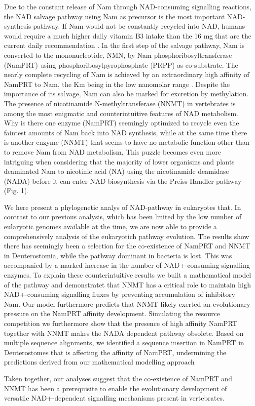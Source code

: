 Due to the constant release of Nam through NAD-consuming signalling reactions, the NAD salvage pathway using Nam as precursor is the most important NAD-synthesis pathway.  If Nam would not be constantly recycled into NAD, humans would require a much higher daily vitamin B3 intake than the 16 mg that are the current daily recommendation \cite{CommissionofEuropeanCommunities2008}.  In the first step of the salvage pathway, Nam is converted to the mononucleotide, NMN, by Nam phosphoribosyltransferase (NamPRT) using phosphoribosylpyrophosphate (PRPP) as co-substrate. The nearly complete recycling of Nam is achieved by an extraordinary high affinity of NamPRT to Nam, the Km being in the low nanomolar range \cite{Burgos2008}. Despite the importance of its salvage, Nam can also be marked for excretion by methylation. The presence of nicotinamide N-methyltransferase (NNMT) in vertebrates \cite{Gossmann2012FEBS} is among the most enigmatic and counterintuitive features of NAD metabolism. Why is there one enzyme (NamPRT) seemingly optimized to recycle even the faintest amounts of Nam back into NAD synthesis, while at the same time there is another enzyme (NNMT) that seems to have no metabolic function other than to remove Nam from NAD metabolism, This puzzle becomes even more intriguing when considering that the majority of lower organisms and plants deaminated Nam to nicotinic acid (NA) using the nicotinamide deamidase (NADA) before it can enter NAD biosynthesis via the Preiss-Handler pathway (Fig. 1).

We here present a phylogenetic analys of NAD-pathway in eukaryotes that. In contrast to our previous analysis, which has been lmited by the low number of eularyotic genomes available at the time, we are now able to provide a comprehensively analysis of the eukaryotich pathway evolution. The results show there has seemingly been a selection for the co-existence of NamPRT and NNMT in Deuterostomia, while the pathway dominant in bacteria is lost. This was accompanied by a marked increase in the number of  NAD+-consuming signalling enzymes. To explain these counterintuitive results we built a mathematical model of the pathway and demonstratet that NNMT has a critical role to maintain high NAD+-consuming signalling fluxes by preventing accumulation of inhibitory Nam. Our model furthermore predicts that NNMT likely exerted an evolutionary pressure on the NamPRT affinity development. Simulating the resource competition we furthermore show that the presence of high affinity NamPRT together with NNMT makes the NADA dependent pathway obsolete.  Based on multiple sequence alignments,  we identified a sequence insertion in NamPRT in Deuterostomes  that is affecting the affinity of NamPRT,  undermining the predictions derived from our mathematical modelling approach 

Taken together, our analyses suggest that the co-existence of NamPRT and NNMT has been a prerequisite to enable the evolutionary development of versatile NAD+-dependent signalling mechanisms present in vertebrates.
